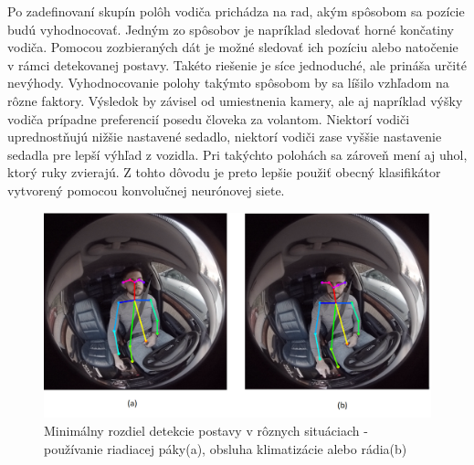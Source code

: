 \documentclass[slovak,master,dept460,male,cpp,cpdeclaration]{diploma}
\begin{document}
Po zadefinovaní skupín polôh vodiča prichádza na rad, akým spôsobom sa pozície budú vyhodnocovať. Jedným zo spôsobov je  napríklad  sledovať horné končatiny vodiča. Pomocou zozbieraných dát je možné sledovať ich pozíciu alebo natočenie v rámci detekovanej postavy. Takéto riešenie  je síce jednoduché, ale prináša  určité nevýhody. Vyhodnocovanie  polohy takýmto spôsobom by sa líšilo vzhľadom na rôzne faktory. Výsledok by závisel od umiestnenia kamery, ale aj napríklad výšky vodiča prípadne preferencií posedu človeka za volantom. Niektorí vodiči uprednostňujú nižšie nastavené sedadlo, niektorí vodiči zase vyššie nastavenie sedadla pre lepší výhľad z vozidla. Pri takýchto polohách sa zároveň mení aj uhol, ktorý ruky zvierajú. Z tohto dôvodu je preto lepšie použiť obecný klasifikátor vytvorený pomocou konvolučnej neurónovej siete.

\begin{figure}[H]
	\centering
	\includegraphics[width=1\textwidth]{Figures/radioUsage.png}
	\caption{Minimálny rozdiel detekcie postavy v rôznych situáciach - používanie riadiacej páky(a), obsluha klimatizácie alebo rádia(b)}
	\label{fig:radioUsage}
\end{figure}
\end{document}
